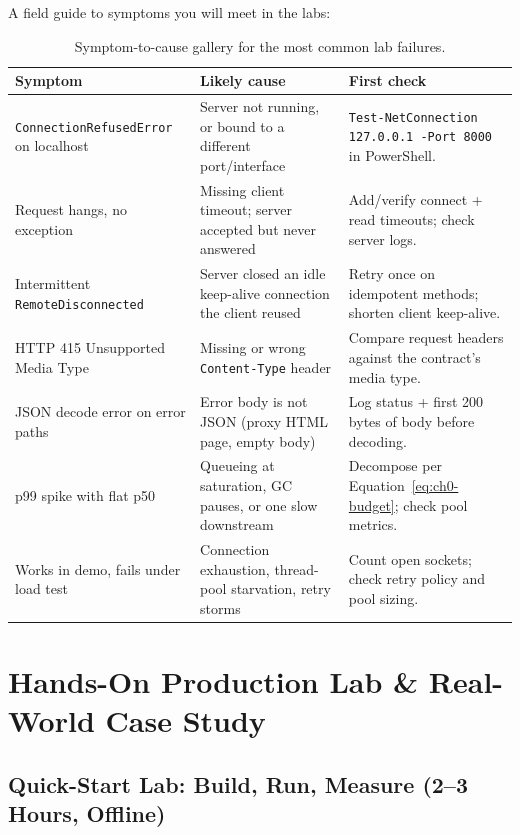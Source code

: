 A field guide to symptoms you will meet in the labs:

\begin{table}[h]
  \centering
  \small
  \begin{tabularx}{\textwidth}{X X X}
    \toprule
    \textbf{Symptom} & \textbf{Likely cause} & \textbf{First check} \\
    \midrule
    \texttt{ConnectionRefusedError} on localhost &
      Server not running, or bound to a different port/interface &
      \texttt{Test-NetConnection 127.0.0.1 -Port 8000} in PowerShell. \\
    Request hangs, no exception &
      Missing client timeout; server accepted but never answered &
      Add/verify connect + read timeouts; check server logs. \\
    Intermittent \texttt{RemoteDisconnected} &
      Server closed an idle keep-alive connection the client reused &
      Retry once on idempotent methods; shorten client keep-alive. \\
    HTTP 415 Unsupported Media Type &
      Missing or wrong \texttt{Content-Type} header &
      Compare request headers against the contract's media type. \\
    JSON decode error on error paths &
      Error body is not JSON (proxy HTML page, empty body) &
      Log status + first 200 bytes of body before decoding. \\
    p99 spike with flat p50 &
      Queueing at saturation, GC pauses, or one slow downstream &
      Decompose per Equation~\eqref{eq:ch0-budget}; check pool metrics. \\
    Works in demo, fails under load test &
      Connection exhaustion, thread-pool starvation, retry storms &
      Count open sockets; check retry policy and pool sizing. \\
    \bottomrule
  \end{tabularx}
  \caption{Symptom-to-cause gallery for the most common lab failures.}
  \label{tab:ch0-gallery}
\end{table}

\section{Hands-On Production Lab \& Real-World Case Study}
\label{sec:ch0-lab}

\subsection{Quick-Start Lab: Build, Run, Measure (2--3 Hours, Offline)}

